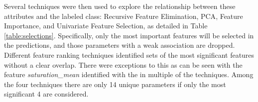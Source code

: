 \documentclass[letterpaper, notitlepage]{report}
\begin{document}
Several techniques were then used to explore the relationship between these attributes and the labeled class: Recursive Feature Elimination, \gls{PCA}, Feature Importance, and Univariate Feature Selection, as detailed in Table \ref{table:selections}.  Specifically, only the most important features will be selected in the predictions, and those parameters with a weak association are dropped. Different feature ranking techniques identified sets of the most significant features without a clear overlap. There were exceptions to this as can be seen with the feature \textit{saturation\_mean} identified with the in multiple of the techniques. Among the four techniques there are only 14 unique parameters if only the most significant 4 are considered.

%
%
%
% 

{
\begin{small}
\renewcommand{\arraystretch}{0.9}
\setlength\LTleft{0pt}
\setlength\LTright{0pt}






\end{small}
}
\end{document}
